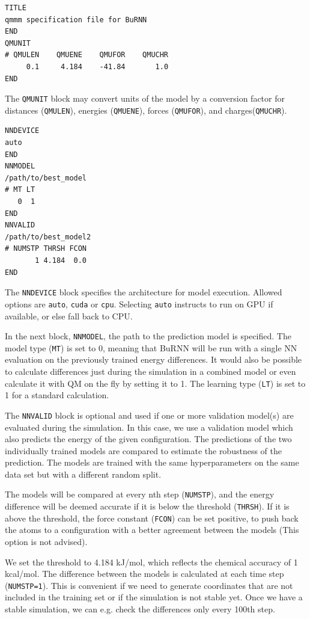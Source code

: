 \begin{lstlisting}[breaklines=true, breakatwhitespace=false]
TITLE
qmmm specification file for BuRNN  
END
QMUNIT
# QMULEN    QMUENE    QMUFOR    QMUCHR
     0.1     4.184    -41.84       1.0
END
\end{lstlisting}

The \texttt{QMUNIT} block may convert units of the model by a conversion factor for distances (\texttt{QMULEN}), energies (\texttt{QMUENE}), forces (\texttt{QMUFOR}), and charges(\texttt{QMUCHR}).

\begin{lstlisting}[breaklines=true, breakatwhitespace=false]
NNDEVICE
auto
END
NNMODEL
/path/to/best_model
# MT LT
   0  1
END
NNVALID
/path/to/best_model2
# NUMSTP THRSH FCON 
       1 4.184  0.0
END
\end{lstlisting}


The \texttt{NNDEVICE} block specifies the architecture for model execution. Allowed options are \texttt{auto}, \texttt{cuda} or \texttt{cpu}. Selecting \texttt{auto} instructs to run on GPU if available, or else fall back to CPU.

In the next block, \texttt{NNMODEL}, the path to the prediction model is specified. The model type (\texttt{MT}) is set to 0, meaning that BuRNN will be run with a single NN evaluation on the previously trained energy differences. It would also be possible to calculate differences just during the simulation in a combined model or even calculate it with QM on the fly by setting it to 1. The learning type (\texttt{LT}) is set to 1 for a standard calculation. 

The \texttt{NNVALID} block is optional and used if one or more validation model(s) are evaluated during the simulation. In this case, we use a validation model which also predicts the energy of the given configuration. The predictions of the two individually trained models are compared to estimate the robustness of the prediction. The models are trained with the same hyperparameters on the same data set but with a different random split.

The models will be compared at every nth step (\texttt{NUMSTP}), and the energy difference will be deemed accurate if it is below the threshold (\texttt{THRSH}). If it is above the threshold, the force constant (\texttt{FCON}) can be set positive, to push back the atoms to a configuration with a better agreement between the models (This option is not advised). 

We set the threshold to 4.184 kJ/mol, which reflects the chemical accuracy of 1 kcal/mol. The difference between the models is calculated at each time step (\texttt{NUMSTP=1}). This is convenient if we need to generate coordinates that are not included in the training set or if the simulation is not stable yet. Once we have a stable simulation, we can e.g. check the differences only every 100th step.

